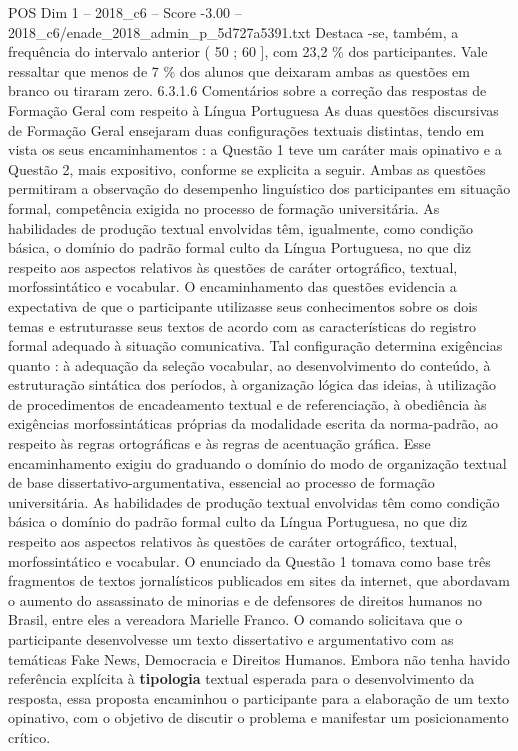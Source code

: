 \begin{textsample}{POS Dim 1 – 2018\_c6 – Score -3.00 – 2018\_c6/enade\_2018\_admin\_p\_5d727a5391.txt}
Destaca -se, também, a frequência do intervalo anterior ( 50 ; 60 ], com 23,2 \% dos participantes.
Vale ressaltar que menos de 7 \% dos alunos que deixaram ambas as questões em branco ou tiraram zero. 6.3.1.6 Comentários sobre a correção das respostas de Formação Geral com respeito à Língua Portuguesa As duas questões discursivas de Formação Geral ensejaram duas configurações textuais distintas, tendo em vista os seus encaminhamentos : a Questão 1 teve um caráter mais opinativo e a Questão 2, mais expositivo, conforme se explicita a seguir.
Ambas as questões permitiram a observação do desempenho linguístico dos participantes em situação formal, competência exigida no processo de formação universitária.
As habilidades de produção textual envolvidas têm, igualmente, como condição básica, o domínio do padrão formal culto da Língua Portuguesa, no que diz respeito aos aspectos relativos às questões de caráter ortográfico, textual, morfossintático e vocabular.
O encaminhamento das questões evidencia a expectativa de que o participante utilizasse seus conhecimentos sobre os dois temas e estruturasse seus textos de acordo com as características do registro formal adequado à situação comunicativa.
Tal configuração determina exigências quanto : à adequação da seleção vocabular, ao desenvolvimento do conteúdo, à estruturação sintática dos períodos, à organização lógica das ideias, à utilização de procedimentos de encadeamento textual e de referenciação, à obediência às exigências morfossintáticas próprias da modalidade escrita da norma-padrão, ao respeito às regras ortográficas e às regras de acentuação gráfica.
Esse encaminhamento exigiu do graduando o domínio do modo de organização textual de base dissertativo-argumentativa, essencial ao processo de formação universitária.
As habilidades de produção textual envolvidas têm como condição básica o domínio do padrão formal culto da Língua Portuguesa, no que diz respeito aos aspectos relativos às questões de caráter ortográfico, textual, morfossintático e vocabular.
O enunciado da Questão 1 tomava como base três fragmentos de textos jornalísticos publicados em sites da internet, que abordavam o aumento do assassinato de minorias e de defensores de direitos humanos no Brasil, entre eles a vereadora Marielle Franco.
O comando solicitava que o participante desenvolvesse um texto dissertativo e argumentativo com as temáticas Fake News, Democracia e Direitos Humanos.
Embora não tenha havido referência explícita à \textbf{tipologia} textual esperada para o desenvolvimento da resposta, essa proposta encaminhou o participante para a elaboração de um texto opinativo, com o objetivo de discutir o problema e manifestar um posicionamento crítico.

\end{textsample}

